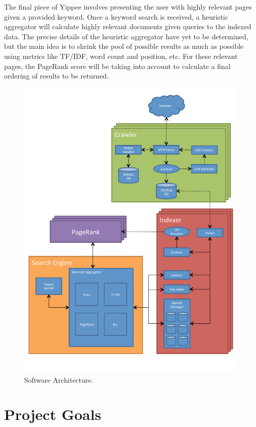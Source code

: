 \documentclass[11pt, letterpaper, oneside, twocolumn]{article}
\begin{document}
The final piece of Yippee involves presenting the user with highly relevant pages given a provided keyword. Once a keyword search is received, a heuristic aggregator will calculate highly relevant documents given queries to the indexed data. The precise details of the heuristic aggregator have yet to be determined, but the main idea is to shrink the pool of possible results as much as possible using metrics like TF/IDF, word count and position, etc.  For these relevant pages, the PageRank score will be taking into account to calculate a final ordering of results to be returned.

\label{sec:SOAR} %
\begin{figure}[!b]
  \centering
  \includegraphics[scale=0.50]{figures/yippee_map.pdf}
  \caption{Software Architecture.}
\end{figure}



\section{ Project Goals }
\label{sec:goals}
\end{document}

